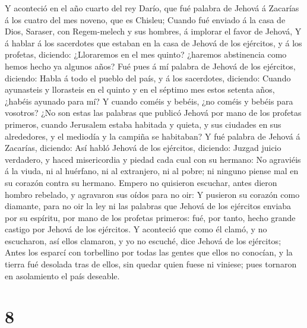  Y aconteció en el año cuarto del rey Darío, que fué palabra
de Jehová á Zacarías á los cuatro del mes noveno, que es Chisleu;
 Cuando fué enviado á la casa de Dios, Saraser, con
Regem-melech y sus hombres, á implorar el favor de Jehová, 
Y á hablar á los sacerdotes que estaban en la casa de Jehová de los
ejércitos, y á los profetas, diciendo: ¿Lloraremos en el mes quinto?
¿haremos abstinencia como hemos hecho ya algunos años?  Fué
pues á mí palabra de Jehová de los ejércitos, diciendo: 
Habla á todo el pueblo del país, y á los sacerdotes, diciendo: Cuando
ayunasteis y llorasteis en el quinto y en el séptimo mes estos setenta
años, ¿habéis ayunado para mí?  Y cuando coméis y bebéis,
¿no coméis y bebéis para vosotros?  ¿No son estas las
palabras que publicó Jehová por mano de los profetas primeros, cuando
Jerusalem estaba habitada y quieta, y sus ciudades en sus alrededores, y
el mediodía y la campiña se habitaban?  Y fué palabra de
Jehová á Zacarías, diciendo:  Así habló Jehová de los
ejércitos, diciendo: Juzgad juicio verdadero, y haced misericordia y
piedad cada cual con su hermano:  No agraviéis á la viuda,
ni al huérfano, ni al extranjero, ni al pobre; ni ninguno piense mal en
su corazón contra su hermano.  Empero no quisieron
escuchar, antes dieron hombro rebelado, y agravaron sus oídos para no
oir:  Y pusieron su corazón como diamante, para no oir la
ley ni las palabras que Jehová de los ejércitos enviaba por su espíritu,
por mano de los profetas primeros: fué, por tanto, hecho grande castigo
por Jehová de los ejércitos.  Y aconteció que como él
clamó, y no escucharon, así ellos clamaron, y yo no escuché, dice Jehová
de los ejércitos;  Antes los esparcí con torbellino por
todas las gentes que ellos no conocían, y la tierra fué desolada tras de
ellos, sin quedar quien fuese ni viniese; pues tornaron en asolamiento
el país deseable.

\hypertarget{section-7}{%
\section{8}\label{section-7}}

